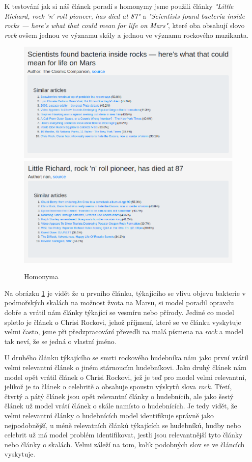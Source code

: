 \documentclass[11pt]{scrartcl} %
\begin{document}
K testování jak si náš článek poradí s homonymy jsme použili články \emph{"Little Richard, rock 'n' roll pioneer, has died at 87"} a \emph{"Scientists found bacteria inside rocks — here’s what that could mean for life on Mars"}, které oba obsahují slovo \emph{rock} ovšem jednou ve významu skály a jednou ve významu rockového muzikanta.

\begin{figure}[h] %
	\centering
	\includegraphics[width=0.7\columnwidth]{images/homonyms_0.png}
	\includegraphics[width=0.7\columnwidth]{images/homonyms_1.png}
	\caption{Homonyma}
	\label{homonyms}
\end{figure}

\bigskip

Na obrázku \ref{homonyms} je vidět že u prvního článku, týkajícího se vlivu objevu bakterie v podmořských skalách na možnost žvota na Marsu, si model poradil opravdu dobře a vrátil nám články týkající se vesmíru nebo přírody. Jediné co model spletlo je článek o Chrisi Rockovi, jehož příjmení, které se ve článku vyskytuje velmi často, jsme při předzpracování převedli na malá písmena na \emph{rock} a model tak neví, že se jedná o vlastní jméno.

\bigskip

U druhého článku týkajícího se smrti rockového hudebníka nám jako první vrátil velmi relevantní článek o jiném stárnoucím hudebníkovi. Jako druhý článek nám model opět vrátil článek o Chrisi Rockovi, jež je teď pro model velmi relevantní, jelikož je to článek o celebritě a obsahuje spoustu výskytů slova \emph{rock}. Třetí, čtvrtý a pátý článek jsou opět relevantní články o hudebnícíh, ale jako šestý článek už model vrátí článek o skále namísto o hudebnících. Je tedy vidět, že velmi relevantní články o hudebnících model identifikuje správně jako nejpodobnější, u méně relevatních článků týkajících se hudebníků, hudby nebo celebrit už má model problém identifikovat, jestli jsou relevantnější tyto články nebo články o skalách. Velmi záleží na tom, kolik podobných slov se ve článcích vyskytuje.
\end{document}
